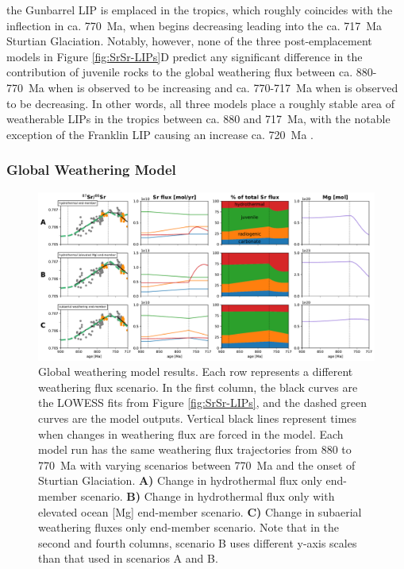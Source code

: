 the Gunbarrel LIP is emplaced in the tropics, which roughly coincides with the inflection in \SrSr ca. 770~Ma, when \SrSr begins decreasing leading into the ca. 717~Ma Sturtian Glaciation. Notably, however, none of the three post-emplacement models in Figure \ref{fig:SrSr-LIPs}D predict any significant difference in the contribution of juvenile rocks to the global weathering flux between ca. 880-770~Ma when \SrSr is observed to be increasing and ca. 770-717~Ma when \SrSr is observed to be decreasing. In other words, all three models place a roughly stable area of weatherable LIPs in the tropics between ca. 880 and 717~Ma, with the notable exception of the Franklin LIP causing an increase ca. 720~Ma \citep{Denyszyn2009a}.

\subsubsection{Global Weathering Model}

\begin{figure}[h!]
\begin{center}
	\includegraphics[width=\textwidth]{figures/Tambien/Sr-model-flux-changes.pdf}
	\caption[Global weathering model.]{Global weathering model results. Each row represents a different weathering flux scenario. In the first column, the black curves are the LOWESS fits from Figure \ref{fig:SrSr-LIPs}, and the dashed green curves are the model outputs. Vertical black lines represent times when changes in weathering flux are forced in the model. Each model run has the same weathering flux trajectories from 880 to 770~Ma with varying scenarios between 770~Ma and the onset of Sturtian Glaciation. \textbf{A)} Change in hydrothermal flux only end-member scenario. \textbf{B)} Change in hydrothermal flux only with elevated ocean [Mg] end-member scenario. \textbf{C)} Change in subaerial weathering fluxes only end-member scenario. Note that in the second and fourth columns, scenario B uses different y-axis scales than that used in scenarios A and B.}
	\label{fig:Sr-model-flux-changes}
\end{center}
\end{figure}

